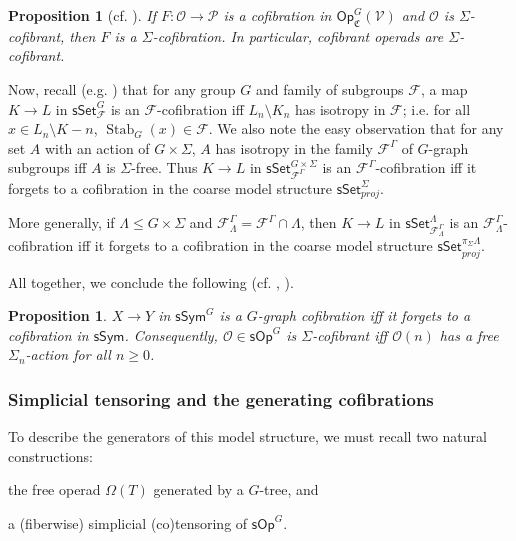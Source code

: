\documentclass[a4paper,10pt
,draft
]{article}%
\numberwithin{equation}{section}
\numberwithin{figure}{section}
\newtheorem{proposition}[equation]{Proposition}%
\theoremstyle{definition} %
\newcommand{\Sym}{\ensuremath{\mathsf{Sym}}}%
\newcommand{\sSet}{\ensuremath{\mathsf{sSet}}}%
\newcommand{\Op}{\mathsf{Op}}%
\newcommand{\sOp}{\ensuremath{\mathsf{sOp}}}%
\DeclareMathOperator{\Stab}{Stab}
\newcommand{\F}{\ensuremath{\mathcal F}}
\newcommand{\V}{\ensuremath{\mathcal V}}
\renewcommand{\O}{\ensuremath{\mathcal O}}
\renewcommand{\P}{\ensuremath{\mathcal P}}
\newcommand{\1}{\ensuremath{\mathbbm 1}}%
\begin{document}
\begin{proposition}[{cf. \cite[Prop. 3.63]{BP_HGOP}}]
      \label{SIGMAG_COF PROP}
      If $F \colon \O \to \P$ is a cofibration in $\Op^G_{\mathfrak C}(\V)$ and $\O$ is $\Sigma$-cofibrant,
      then $F$ is a $\Sigma$-cofibration.
      In particular, cofibrant operads are $\Sigma$-cofibrant.
\end{proposition}

Now, recall (e.g. \cite[Prop. 2.16]{Ste16}) that for any group $G$ and family of subgroups $\F$,
a map $K \to L$ in $\sSet^{G}_\F$ is an $\F$-cofibration iff $L_n \setminus K_n$ has isotropy in $\F$; i.e. for all $x \in L_n \setminus K-n$, $\Stab_{G}(x) \in \F$. 
% 
We also note the easy observation that for any set $A$ with an action of $G \times \Sigma$,
$A$ has isotropy in the family $\F^\Gamma$ of $G$-graph subgroups
iff
$A$ is $\Sigma$-free.
% 
Thus $K \to L$ in $\sSet^{G \times \Sigma}_{\F^\Gamma}$ is an $\F^\Gamma$-cofibration
iff
it forgets to a cofibration in the coarse model structure $\sSet^\Sigma_{proj}$.

More generally, if $\Lambda \leq G \times \Sigma$ and $\F^\Gamma_{\Lambda} = \F^\Gamma \cap \Lambda$,
then $K \to L$ in $\sSet^{\Lambda}_{\F^\Gamma_\Lambda}$ is an $\F^\Gamma_\Lambda$-cofibration
iff
it forgets to a cofibration in the coarse model structure $\sSet^{\pi_{\Sigma}\Lambda}_{proj}$.
      
All together, we conclude the following (cf. \cite[Remark 6.7]{Per18}, \cite[discussion before Thm. 2.31]{BP_edss}).

\begin{proposition}
      \label{SGS_COF_PROP}
      $X \to Y$ in $\mathsf{sSym}^G$ is a $G$-graph cofibration iff
      it forgets to a cofibration in $\mathsf{sSym}$.
      Consequently, $\O \in \sOp^G$ is $\Sigma$-cofibrant iff $\O(n)$ has a free $\Sigma_n$-action for all $n \geq 0$.
\end{proposition}

\subsubsection{Simplicial tensoring and the generating cofibrations}

To describe the generators of this model structure, we must recall two natural constructions:
\begin{enumerate*}
\item the free operad $\Omega(T)$ generated by a $G$-tree, and
\item a (fiberwise) simplicial (co)tensoring of $\sOp^G$.
\end{enumerate*}
\end{document}
